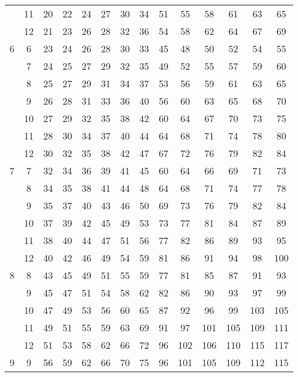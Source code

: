 \documentclass{article}
\begin{document}
\begin{center}
\begin{tabular}[t]{|c|c|*{6}{c}|*{6}{c}|}
     & 11 &  20 &  22 &  24 &  27 &  30 &  34 &  51 &  55 &  58 &  61 &  63 &  65 \\
     & 12 &  21 &  23 &  26 &  28 &  32 &  36 &  54 &  58 &  62 &  64 &  67 &  69 \\
  \hline
   6 &  6 &  23 &  24 &  26 &  28 &  30 &  33 &  45 &  48 &  50 &  52 &  54 &  55 \\
     &  7 &  24 &  25 &  27 &  29 &  32 &  35 &  49 &  52 &  55 &  57 &  59 &  60 \\
     &  8 &  25 &  27 &  29 &  31 &  34 &  37 &  53 &  56 &  59 &  61 &  63 &  65 \\
     &  9 &  26 &  28 &  31 &  33 &  36 &  40 &  56 &  60 &  63 &  65 &  68 &  70 \\
     & 10 &  27 &  29 &  32 &  35 &  38 &  42 &  60 &  64 &  67 &  70 &  73 &  75 \\
     & 11 &  28 &  30 &  34 &  37 &  40 &  44 &  64 &  68 &  71 &  74 &  78 &  80 \\
     & 12 &  30 &  32 &  35 &  38 &  42 &  47 &  67 &  72 &  76 &  79 &  82 &  84 \\
  \hline
   7 &  7 &  32 &  34 &  36 &  39 &  41 &  45 &  60 &  64 &  66 &  69 &  71 &  73 \\
     &  8 &  34 &  35 &  38 &  41 &  44 &  48 &  64 &  68 &  71 &  74 &  77 &  78 \\
     &  9 &  35 &  37 &  40 &  43 &  46 &  50 &  69 &  73 &  76 &  79 &  82 &  84 \\
     & 10 &  37 &  39 &  42 &  45 &  49 &  53 &  73 &  77 &  81 &  84 &  87 &  89 \\
     & 11 &  38 &  40 &  44 &  47 &  51 &  56 &  77 &  82 &  86 &  89 &  93 &  95 \\
     & 12 &  40 &  42 &  46 &  49 &  54 &  59 &  81 &  86 &  91 &  94 &  98 & 100 \\
  \hline
   8 &  8 &  43 &  45 &  49 &  51 &  55 &  59 &  77 &  81 &  85 &  87 &  91 &  93 \\
     &  9 &  45 &  47 &  51 &  54 &  58 &  62 &  82 &  86 &  90 &  93 &  97 &  99 \\
     & 10 &  47 &  49 &  53 &  56 &  60 &  65 &  87 &  92 &  96 &  99 & 103 & 105 \\
     & 11 &  49 &  51 &  55 &  59 &  63 &  69 &  91 &  97 & 101 & 105 & 109 & 111 \\
     & 12 &  51 &  53 &  58 &  62 &  66 &  72 &  96 & 102 & 106 & 110 & 115 & 117 \\
  \hline
   9 &  9 &  56 &  59 &  62 &  66 &  70 &  75 &  96 & 101 & 105 & 109 & 112 & 115 \\

\end{tabular}
\end{center}
\end{document}

